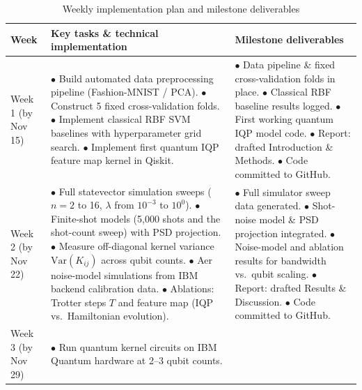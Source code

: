 \documentclass[conference]{IEEEtran}
\begin{document}
\begin{table}[t]
\centering
\caption{Weekly implementation plan and milestone deliverables}
\label{tab:plan}
\renewcommand{\arraystretch}{1.15}
\begin{tabular}{@{}p{}p{}p{}@{}}
\toprule
Week & Key tasks \& technical implementation & Milestone deliverables \\
\midrule
Week 1 (by Nov 15) &
$\bullet$ Build automated data preprocessing pipeline (Fashion-MNIST / PCA).\newline
$\bullet$ Construct 5 fixed cross-validation folds.\newline
$\bullet$ Implement classical RBF SVM baselines with hyperparameter grid search.\newline
$\bullet$ Implement first quantum IQP feature map kernel in Qiskit. &
$\bullet$ Data pipeline \& fixed cross-validation folds in place.\newline
$\bullet$ Classical RBF baseline results logged.\newline
$\bullet$ First working quantum IQP model code.\newline
$\bullet$ Report: drafted Introduction \& Methods.\newline
$\bullet$ Code committed to GitHub. \\
\midrule
Week 2 (by Nov 22) &
$\bullet$ Full statevector simulation sweeps ($n=2$ to 16, $\lambda$ from $10^{-3}$ to $10^{0}$).\newline
$\bullet$ Finite-shot models (5{,}000 shots and the shot-count sweep) with PSD projection.\newline
$\bullet$ Measure off-diagonal kernel variance $\mathrm{Var}(K_{ij})$ across qubit counts.\newline
$\bullet$ Aer noise-model simulations from IBM backend calibration data.\newline
$\bullet$ Ablations: Trotter steps $T$ and feature map (IQP vs.\ Hamiltonian evolution). &
$\bullet$ Full simulator sweep data generated.\newline
$\bullet$ Shot-noise model \& PSD projection integrated.\newline
$\bullet$ Noise-model and ablation results for bandwidth vs.\ qubit scaling.\newline
$\bullet$ Report: drafted Results \& Discussion.\newline
$\bullet$ Code committed to GitHub. \\
\midrule
Week 3 (by Nov 29) &
$\bullet$ Run quantum kernel circuits on IBM Quantum hardware at 2--3 qubit counts.\newline

\end{tabular}
\end{table}
\end{document}
